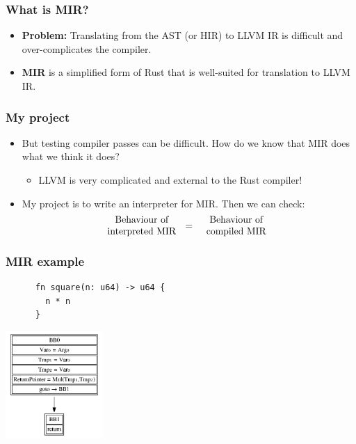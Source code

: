 \documentclass{beamer}
\begin{document}
\begin{frame}
  \frametitle{What is MIR?}

  \begin{itemize}
    \item \textbf{Problem:} Translating from the AST (or HIR) to LLVM IR is
      difficult and over-complicates the compiler.

    \item \textbf{MIR} is a simplified form of Rust that is well-suited for
      translation to LLVM IR.
  \end{itemize}
\end{frame}

\begin{frame}
  \frametitle{My project}

  \begin{itemize}
    \item But testing compiler passes can be difficult. How do we know that MIR
      does what we think it does?

      \begin{itemize}
        \item LLVM is very complicated and external to the Rust compiler!
      \end{itemize}
      \pause

    \item My project is to write an interpreter for MIR. Then we can check:
      \begin{equation*}
        \text{\parbox{3cm}{\centering Behaviour of\\ interpreted MIR}}
        =
        \text{\parbox{3cm}{\centering Behaviour of\\ compiled MIR}}
      \end{equation*}
  \end{itemize}
\end{frame}

\begin{frame}[fragile]
  \frametitle{MIR example}

  \begin{center}
    \begin{verbatim}
      fn square(n: u64) -> u64 {
        n * n
      }
    \end{verbatim}

    \includegraphics[width=140px]{mir-sample.png}
  \end{center}
\end{frame}
\end{document}
